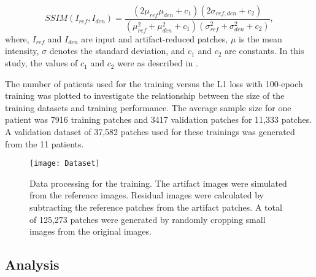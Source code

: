 \documentclass[num-refs]{wiley-article}
\begin{document}
\begin{equation}
SSIM(I_{ref}, I_{den}) = \frac{(2\mu_{ref} \mu_{den}+c_1)(2\sigma_{ref,den}+c_2)}{(\mu_{ref}^2 + \mu_{den}^2 + c_1)(\sigma_{ref}^2 + \sigma_{den}^2+c_2)},
\end{equation}
where, $I_{ref}$ and $I_{den}$ are input and artifact-reduced patches, $\mu$ is the mean intensity, $\sigma$ denotes the standard deviation, and $c_1$ and $c_2$ are constants. In this study, the values of $c_1$ and $c_2$ were as described in \cite{wang2004image}.

The number of patients used for the training versus the L1 loss with 100-epoch training was plotted to investigate the relationship between the size of the training datasets and training performance. The average sample size for one patient was 7916 training patches and 3417 validation patches for 11,333 patches. A validation dataset of 37,582 patches used for these trainings was generated from the 11 patients.


\begin{figure}[bt]
\centering
\texttt{[image: Dataset]}
\caption{Data processing for the training. The artifact images were simulated from the reference images. Residual images were calculated by subtracting the reference patches from the artifact patches. A total of 125,273 patches were generated by randomly cropping small images from the original images.}
\label{fig_dataset}
\end{figure}


\subsection{Analysis}\label{sec_anal}
\end{document}
